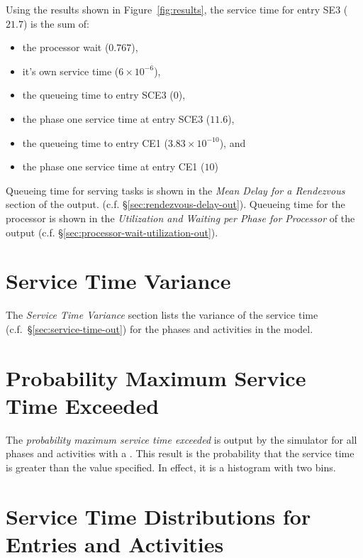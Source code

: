 Using the results shown in Figure~\ref{fig:results}, the
service time for entry SE3 ($21.7$) is the sum of:
\begin{itemize}
\item the processor wait ($0.767$),
\item it's own service time ($6\times 10^{-6}$),
\item the queueing time to entry SCE3 ($0$),
\item the phase one service time at entry SCE3 ($11.6$),
\item the queueing time to entry CE1 ($3.83\times 10^{-10}$), and
\item the phase one service time at entry CE1 ($10$)
\end{itemize}

Queueing time for serving tasks is shown in the \emph{Mean Delay for a
  Rendezvous} section of the output.  (c.f.
\S\ref{sec:rendezvous-delay-out}).  Queueing time for the processor is
shown in the \emph{Utilization and Waiting per Phase for Processor} of
the output (c.f.
\S\ref{sec:processor-wait-utilization-out}).

\section{Service Time Variance}
\label{sec:service-time-variance-out}

The \emph{Service Time
  Variance}
section lists the variance of the service time
(c.f.~\S\ref{sec:service-time-out}) for the phases and activities in
the model.

\section{Probability Maximum Service Time Exceeded}
\label{sec:service-time-exceeded-out}

The \emph{probability maximum service time exceeded} is output by the
simulator for all phases and activities with a .  This result is the probability
that the service time is greater than the value specified.  In effect, it is a histogram with two bins.

\section{Service Time Distributions for Entries and Activities}
\label{sec:service-time-distribution-out}

